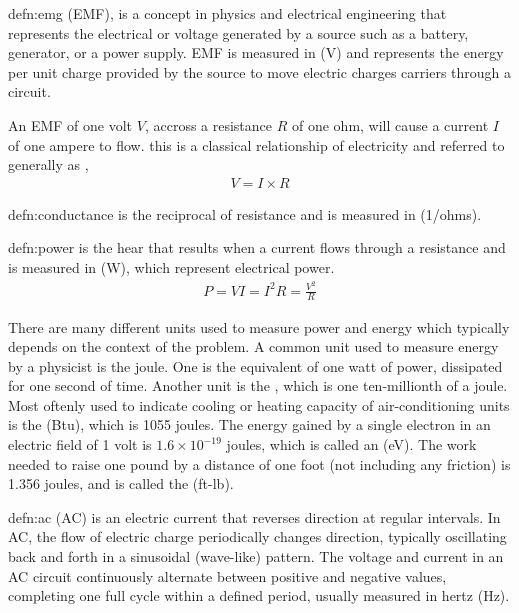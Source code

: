 \begin{defn}{defn:emg}
 (EMF), is a concept in physics and electrical engineering that represents the electrical  or voltage generated by a source such as a battery, generator, or a power supply. EMF is measured in  (V) and represents the energy per unit charge provided by the source to move electric charges carriers through a circuit. 
\end{defn}

An EMF of one volt $V$, accross a resistance $R$ of one ohm, will cause a current $I$ of one ampere to flow. this is a classical relationship of electricity and referred to generally as ,
\begin{align}
V = I \times R
\end{align}

\begin{defn}[Conductance]{defn:conductance}
 is the reciprocal of resistance and is measured in  (1/ohms). 
\end{defn}

\begin{defn}[Power]{defn:power}
 is the hear that results when a current flows through a resistance and is measured in  (W), which represent electrical power.
\begin{align}
P = V I = I^2 R = \frac{V^2}{R}
\end{align}
\end{defn}

There are many different units used to measure power and energy which typically depends on the context of the problem. A common unit used to measure energy by a physicist is the joule. One  is the equivalent of one watt of power, dissipated for one second of time. Another unit is the , which is one ten-millionth of a joule. Most oftenly used to indicate cooling or heating capacity of air-conditioning units is the  (Btu), which is 1055 joules. The energy gained by a single electron in an electric field of 1 volt is $1.6 \times 10^{-19}$ joules, which is called an  (eV). The work needed to raise one pound by a distance of one foot (not including any friction) is 1.356 joules, and is called the  (ft-lb).

\begin{defn}{defn:ac}
 (AC) is an electric current that reverses direction at regular intervals. In AC, the flow of electric charge periodically changes direction, typically oscillating back and forth in a sinusoidal (wave-like) pattern. The voltage and current in an AC circuit continuously alternate between positive and negative values, completing one full cycle within a defined period, usually measured in hertz (Hz).
\end{defn}

